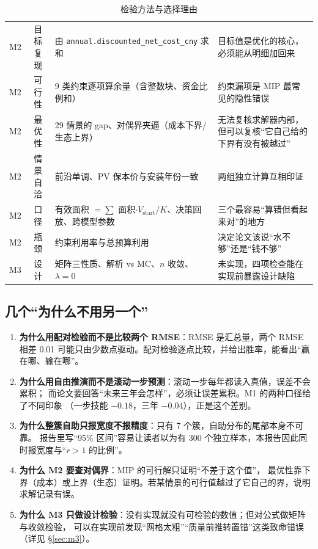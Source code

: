 \documentclass[11pt,a4paper]{ctexart}
\begin{document}
\begin{table}[htbp]
\begin{tabularx}{\textwidth}{|c|c|X|X|}
M2 & 目标复现 & 由 \texttt{annual.discounted\_net\_cost\_cny} 求和 & 目标值是优化的核心，必须能从明细加回来 \\
M2 & 可行性 & 9 类约束逐项算余量（含整数块、资金比例和） & 约束漏项是 MIP 最常见的隐性错误 \\
M2 & 最优性 & 29 情景的 gap、对偶界夹逼（成本下界/生态上界） & 无法复核求解器内部，但可以复核“它自己给的下界有没有被越过” \\
M2 & 情景自洽 & 前沿单调、PV 保本价与安装年份一致 & 两组独立计算互相印证 \\
M2 & 口径 & 有效面积 $=\sum$ 面积$\cdot V_{\text{start}}/K$、决策回放、跨模型参数 & 三个最容易“算错但看起来对”的地方 \\
M2 & 瓶颈 & 约束利用率与总预算利用 & 决定论文该说“水不够”还是“钱不够” \\
M3 & 设计 & 矩阵三性质、解析 vs MC、$n$ 收敛、$\lambda=0$ & 未实现，四项检查能在实现前暴露设计缺陷 \\
\bottomrule
\end{tabularx}
\caption{检验方法与选择理由}\label{tab:methods}
\end{table}

\subsection{几个“为什么不用另一个”}

\begin{enumerate}
\item \textbf{为什么用配对检验而不是比较两个 RMSE}：RMSE 是汇总量，两个 RMSE 相差 0.01
      可能只由少数点驱动。配对检验逐点比较，并给出胜率，能看出“赢在哪、输在哪”。
\item \textbf{为什么用自由推演而不是滚动一步预测}：滚动一步每年都读入真值，误差不会累积；
      而论文要回答“未来三年会怎样”，必须让误差累积。M1 的两种口径给了不同印象
      （一步技能 $-0.18$，三年 $-0.04$），正是这个差别。
\item \textbf{为什么整簇自助只报宽度不报精度}：只有 7 个簇，自助分布的尾部本身不可靠。
      报告里写“95\% 区间”容易让读者以为有 300 个独立样本，本报告因此同时报宽度与“$r>1$ 的比例”。
\item \textbf{为什么 M2 要查对偶界}：MIP 的可行解只证明“不差于这个值”，
      最优性靠下界（成本）或上界（生态）证明。若某情景的可行值越过了它自己的界，说明求解记录有误。
\item \textbf{为什么 M3 只做设计检验}：没有实现就没有可检验的数值；但对公式做矩阵与收敛检验，
      可以在实现前发现“网格太粗”“质量前推转置错”这类致命错误（详见 \S\ref{sec:m3}）。
\end{enumerate}
\end{document}
